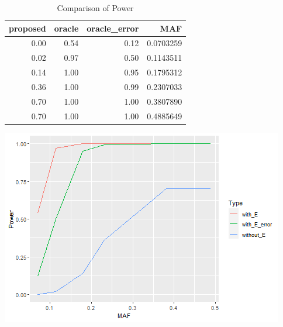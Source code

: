 \documentclass[
]{article}
\newenvironment{Shaded}{\begin{snugshade}}{\end{snugshade}}
\newcommand{\CommentTok}[1]{\textcolor[rgb]{0.56,0.35,0.01}{\textit{#1}}}
\newcommand{\DataTypeTok}[1]{\textcolor[rgb]{0.13,0.29,0.53}{#1}}
\newcommand{\KeywordTok}[1]{\textcolor[rgb]{0.13,0.29,0.53}{\textbf{#1}}}
\newcommand{\NormalTok}[1]{#1}
\newcommand{\OperatorTok}[1]{\textcolor[rgb]{0.81,0.36,0.00}{\textbf{#1}}}
\newcommand{\StringTok}[1]{\textcolor[rgb]{0.31,0.60,0.02}{#1}}
\begin{document}
\begin{table}

\caption{\label{tab:PowerComparison}Comparison of Power}
\centering
\begin{tabular}[t]{r|r|r|r}
\hline
proposed & oracle & oracle\_error & MAF\\
\hline
0.00 & 0.54 & 0.12 & 0.0703259\\
\hline
0.02 & 0.97 & 0.50 & 0.1143511\\
\hline
0.14 & 1.00 & 0.95 & 0.1795312\\
\hline
0.36 & 1.00 & 0.99 & 0.2307033\\
\hline
0.70 & 1.00 & 1.00 & 0.3807890\\
\hline
0.70 & 1.00 & 1.00 & 0.4885649\\
\hline
\end{tabular}
\end{table}

\begin{Shaded}
\end{Shaded}

\includegraphics{stats-gene-research-progress-v9_files/figure-latex/PowerComparison-1.png}
\end{document}
